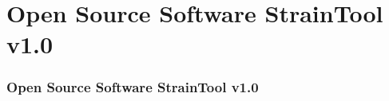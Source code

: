 \section{Open Source Software \textbf{StrainTool v1.0}}
 
\graphicspath{{Chapter2/Figs/}}

\begin{frame}
  \frametitle{Open Source Software \textbf{StrainTool v1.0}}
  \framesubtitle{\citep{anastasiou2019}}
  \label{ch2:straintool}
  
\end{frame}
\note{}

